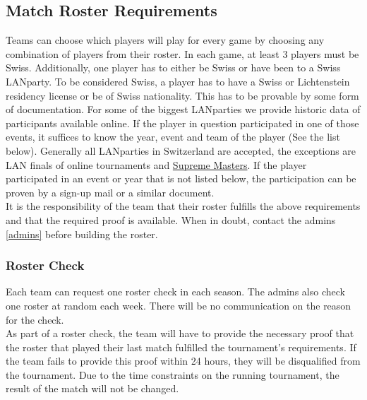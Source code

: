 \documentclass{article}
\begin{document}
\subsection{Match Roster Requirements}
Teams can choose which players will play for every game by choosing any combination of players from their roster.
In each game, at least 3 players must be Swiss. Additionally, one player has to either be Swiss or have been to a Swiss LANparty.
To be considered Swiss, a player has to have a Swiss or Lichtenstein residency license or be of Swiss nationality. This has to be provable by some form of documentation.
For some of the biggest LANparties we provide historic data of participants available online. If the player in question 
participated in one of those events, it suffices to know the year, event and team of the player (See the list below). Generally 
all LANparties in Switzerland are accepted, the exceptions are LAN finals of online tournaments and 
\href{https://www.suprememasters.gg/}{Supreme Masters}. If the player participated in an event or year that is not listed below, 
the participation can be proven by a sign-up mail or a similar document.\\
It is the responsibility of the team that their roster fulfills the above requirements and that the required proof is available. 
When in doubt, contact the admins \ref{admins} before building the roster.

\subsubsection{Roster Check}
Each team can request one roster check in each season. The admins also check one roster at random each week. There will be no communication on the reason for the check.\\
As part of a roster check, the team will have to provide the necessary proof that the roster that played their last match fulfilled the tournament's requirements. If the team fails to provide this proof within 24 hours, they will be disqualified from the tournament. Due to the time constraints on the running tournament, the result of the match will not be changed.
\end{document}
